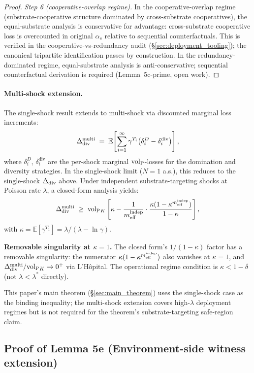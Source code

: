 \begin{proof}
\emph{Step 6 (cooperative-overlap regime).}  In the
cooperative-overlap regime (substrate-cooperative structure
dominated by cross-substrate cooperatives), the equal-substrate
analysis is conservative for advantage: cross-substrate cooperative
loss is overcounted in original $\alpha_s$ relative to sequential
counterfactuals. This is verified in the cooperative-vs-redundancy
audit (\S\ref{sec:deployment_tooling}); the canonical tripartite
identification passes by construction. In the redundancy-dominated
regime, equal-substrate analysis is anti-conservative; sequential
counterfactual derivation is required (Lemma~5c-prime, open work).
\end{proof}

\paragraph{Multi-shock extension.}
The single-shock result extends to multi-shock via discounted
marginal loss increments:
\[
  \Delta_{\mathrm{div}}^{\mathrm{multi}} \;=\; \mathbb{E}\!\left[\sum_{i=1}^{\infty}
  \gamma^{T_i} \bigl(\delta_i^D - \delta_i^{\mathrm{div}}\bigr)\right],
\]
where $\delta_i^{D}$, $\delta_i^{\mathrm{div}}$ are the per-shock
marginal ${\operatorname{vol}_{\mathrm{P}}}$-losses for the domination and diversity
strategies. In the single-shock limit ($N=1$ a.s.), this reduces to
the single-shock $\Delta_{\mathrm{div}}$ above. Under independent substrate-targeting
shocks at Poisson rate $\lambda$, a closed-form analysis yields:
\[
  \Delta_{\mathrm{div}}^{\mathrm{multi}} \;\geq\; {\operatorname{vol}_{\mathrm{P}}}_K \left[\kappa - \frac{1}{m_{\mathrm{eff}}^{\mathrm{indep}}}
  \cdot \frac{\kappa(1 - \kappa^{m_{\mathrm{eff}}^{\mathrm{indep}}})}{1 - \kappa}\right],
\]
with $\kappa = \mathbb{E}[\gamma^{T_1}] = \lambda/(\lambda - \ln \gamma)$.

\textbf{Removable singularity at $\kappa = 1$.}  The closed form's
$1/(1 - \kappa)$ factor has a removable singularity: the numerator
$\kappa(1 - \kappa^{m_{\mathrm{eff}}^{\mathrm{indep}}})$ also vanishes at $\kappa = 1$, and
$\Delta_{\mathrm{div}}^{\mathrm{multi}}/{\operatorname{vol}_{\mathrm{P}}}_K \to 0^+$ via L'H\^opital. The
operational regime condition is $\kappa < 1 - \delta$ (not
$\lambda < \lambda^*$ directly).

This paper's main theorem (\S\ref{sec:main_theorem}) uses the
single-shock case as the binding inequality; the multi-shock
extension covers high-$\lambda$ deployment regimes but is not
required for the theorem's substrate-targeting safe-region claim.

\subsection{Proof of Lemma 5e (Environment-side witness extension)}
\label{app:proof_lem5e}


